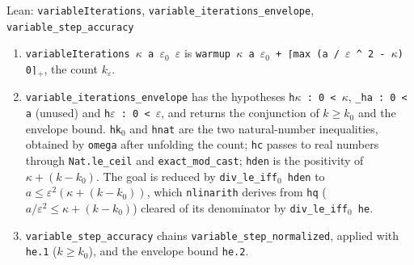 \documentclass[11pt,a4paper]{article}
\begin{document}
\begin{leanbox}{Lean: \texttt{variableIterations}, \texttt{variable\_\allowbreak{}iterations\_\allowbreak{}envelope}, \texttt{variable\_\allowbreak{}step\_\allowbreak{}accuracy}}
\begin{enumerate}
\item \texttt{variable\allowbreak{}Iterations \ensuremath{\kappa} a \ensuremath{\varepsilon}\ensuremath{{}_{0}} \ensuremath{\varepsilon}} is \texttt{warmup \ensuremath{\kappa} a \ensuremath{\varepsilon}\ensuremath{{}_{0}} + ⌈max (a /\allowbreak{} \ensuremath{\varepsilon} \textasciicircum{} 2 -\allowbreak{} \ensuremath{\kappa}) 0⌉\ensuremath{{}_{+}}}, the count \(k_\varepsilon\).

\item \texttt{variable\_\allowbreak{}iterations\_\allowbreak{}envelope} has the hypotheses \texttt{h\ensuremath{\kappa} : 0 < \ensuremath{\kappa}}, \texttt{\_\allowbreak{}ha : 0 < a} (unused) and \texttt{h\ensuremath{\varepsilon} : 0 < \ensuremath{\varepsilon}}, and returns the conjunction of \(k\ge k_0\) and the envelope bound. \texttt{hk\ensuremath{{}_{0}}} and \texttt{hnat} are the two natural-number inequalities, obtained by \texttt{omega} after unfolding the count; \texttt{hc} passes to real numbers through \texttt{Nat.\allowbreak{}le\_\allowbreak{}ceil} and \texttt{exact\_\allowbreak{}mod\_\allowbreak{}cast}; \texttt{hden} is the positivity of \(\kappa+(k-k_0)\). The goal is reduced by \texttt{div\_\allowbreak{}le\_\allowbreak{}iff\ensuremath{{}_{0}} hden} to \(a\le\varepsilon^2(\kappa+(k-k_0))\), which \texttt{nlinarith} derives from \texttt{hq} (\(a/\varepsilon^2\le\kappa+(k-k_0)\)) cleared of its denominator by \texttt{div\_\allowbreak{}le\_\allowbreak{}iff\ensuremath{{}_{0}} he}.

\item \texttt{variable\_\allowbreak{}step\_\allowbreak{}accuracy} chains \texttt{variable\_\allowbreak{}step\_\allowbreak{}normalized}, applied with \texttt{he.\allowbreak{}1} (\(k\ge k_0\)), and the envelope bound \texttt{he.\allowbreak{}2}.

\end{enumerate}
\end{leanbox}
\end{document}
